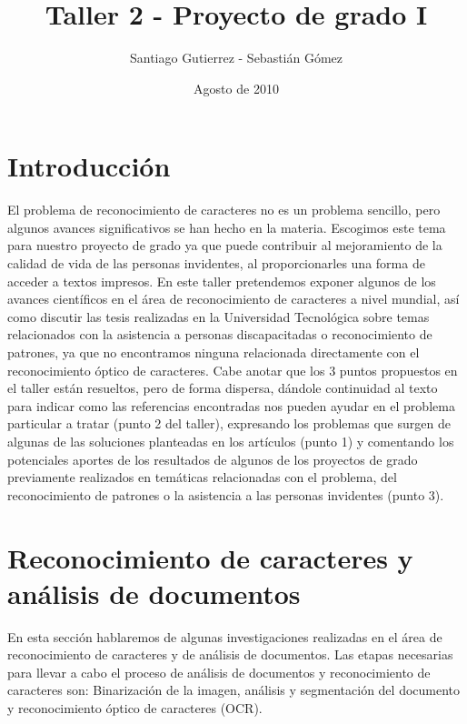 \documentclass[a4paper, 11pt, oneside]{article}
\begin{document}
\title {Taller 2 - Proyecto de grado I}
\author { Santiago Gutierrez - Sebastián Gómez }
\date {Agosto de 2010}
\maketitle

	\section{Introducción}
	El problema de reconocimiento de caracteres no es un problema sencillo, pero algunos
	avances significativos se han hecho en la materia. Escogimos este tema para nuestro
        proyecto de grado ya que puede contribuir al mejoramiento de la calidad de vida de 
        las personas invidentes, al proporcionarles una forma de acceder a textos impresos.\newline
	En este taller pretendemos exponer algunos de los avances científicos en el área
	de reconocimiento de caracteres a nivel mundial, así como discutir las tesis
	realizadas en la Universidad Tecnológica sobre temas relacionados con la asistencia
	a personas discapacitadas o reconocimiento de patrones, ya que no encontramos ninguna
        relacionada directamente con el reconocimiento óptico de caracteres.
	\newline
        Cabe anotar que los 3 puntos propuestos en el taller están resueltos, pero de forma 
        dispersa, dándole continuidad al texto para indicar como las referencias encontradas 
        nos pueden ayudar en el problema particular a tratar (punto 2 del taller), expresando 
        los problemas que surgen de algunas de las soluciones planteadas en los artículos 
        (punto 1) y comentando los potenciales aportes de los resultados de algunos de los 
        proyectos de grado previamente realizados en temáticas relacionadas con el problema,
        del reconocimiento de patrones o la asistencia a las personas invidentes (punto 3).
	
	\section{Reconocimiento de caracteres y análisis de documentos}
	En esta sección hablaremos de algunas investigaciones realizadas en el área
	de reconocimiento de caracteres y de análisis de documentos.
	Las etapas necesarias para llevar a cabo el proceso de análisis de documentos
	y reconocimiento de caracteres son: Binarización de la imagen, análisis y
	segmentación del documento y reconocimiento óptico de caracteres (OCR).
	
\end{document}
